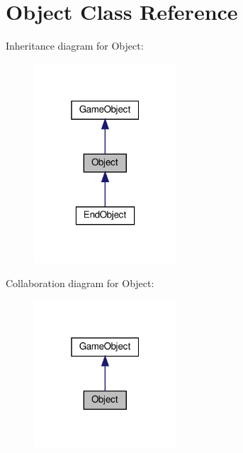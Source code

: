 \hypertarget{classObject}{}\section{Object Class Reference}
\label{classObject}


Inheritance diagram for Object\+:
\nopagebreak
\begin{figure}[H]
\begin{center}
\leavevmode
\includegraphics[width=151pt]{classObject__inherit__graph}
\end{center}
\end{figure}


Collaboration diagram for Object\+:
\nopagebreak
\begin{figure}[H]
\begin{center}
\leavevmode
\includegraphics[width=151pt]{classObject__coll__graph}
\end{center}
\end{figure}
